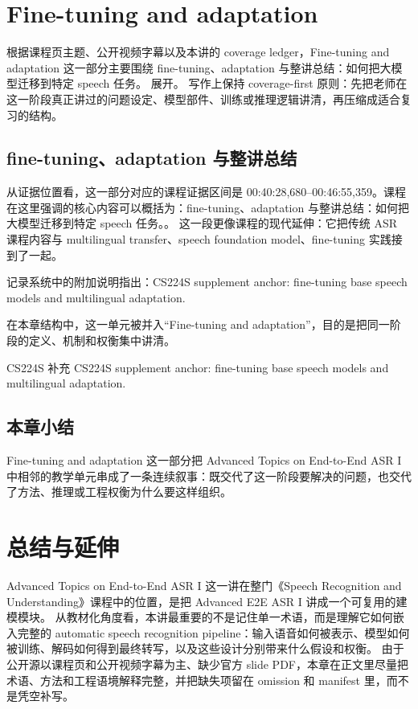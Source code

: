 \documentclass[a4paper]{article}
\begin{document}
\section{Fine-tuning and adaptation}
根据课程页主题、公开视频字幕以及本讲的 coverage ledger，Fine-tuning and adaptation 这一部分主要围绕 fine-tuning、adaptation 与整讲总结：如何把大模型迁移到特定 speech 任务。 展开。
写作上保持 coverage-first 原则：先把老师在这一阶段真正讲过的问题设定、模型部件、训练或推理逻辑讲清，再压缩成适合复习的结构。

\subsection{fine-tuning、adaptation 与整讲总结}
从证据位置看，这一部分对应的课程证据区间是 00:40:28,680--00:46:55,359。课程在这里强调的核心内容可以概括为：fine-tuning、adaptation 与整讲总结：如何把大模型迁移到特定 speech 任务。。
这一段更像课程的现代延伸：它把传统 ASR 课程内容与 multilingual transfer、speech foundation model、fine-tuning 实践接到了一起。

记录系统中的附加说明指出：CS224S supplement anchor: fine-tuning base speech models and multilingual adaptation.

在本章结构中，这一单元被并入“Fine-tuning and adaptation”，目的是把同一阶段的定义、机制和权衡集中讲清。
\begin{knowledgebox}{CS224S 补充}
CS224S supplement anchor: fine-tuning base speech models and multilingual adaptation.
\end{knowledgebox}

\subsection{本章小结}
Fine-tuning and adaptation 这一部分把 Advanced Topics on End-to-End ASR I 中相邻的教学单元串成了一条连续叙事：既交代了这一阶段要解决的问题，也交代了方法、推理或工程权衡为什么要这样组织。

\section{总结与延伸}
Advanced Topics on End-to-End ASR I 这一讲在整门《Speech Recognition and Understanding》课程中的位置，是把 Advanced E2E ASR I 讲成一个可复用的建模模块。
从教材化角度看，本讲最重要的不是记住单一术语，而是理解它如何嵌入完整的 automatic speech recognition pipeline：输入语音如何被表示、模型如何被训练、解码如何得到最终转写，以及这些设计分别带来什么假设和权衡。
由于公开源以课程页和公开视频字幕为主、缺少官方 slide PDF，本章在正文里尽量把术语、方法和工程语境解释完整，并把缺失项留在 omission 和 manifest 里，而不是凭空补写。
\end{document}
